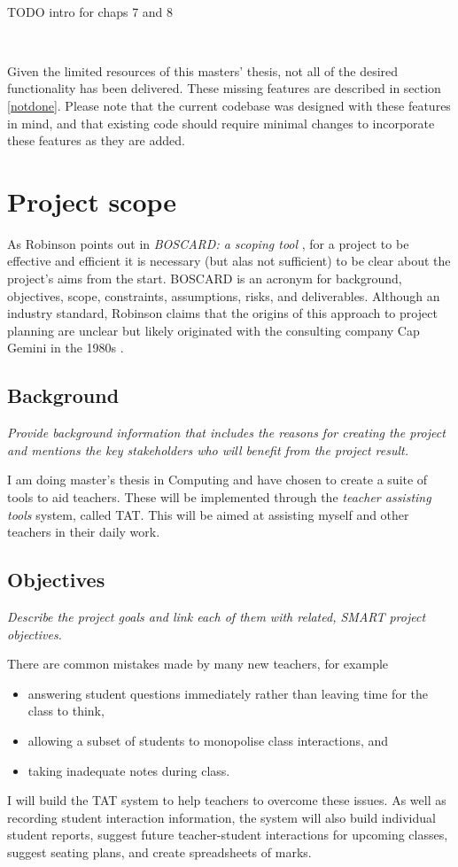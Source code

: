 \documentclass[10pt]{article}
\begin{document}
\

TODO intro for chaps 7 and 8

\

Given the limited resources of this masters' thesis, not all of the desired functionality has been delivered. These missing features are described in section \ref{notdone}. Please note that the current codebase was designed with these features in mind, and that existing code should require minimal changes to incorporate these features as they are added.

\section{Project scope}

As Robinson points out in \emph{BOSCARD: a scoping tool} \cite{Rob19}, for a project to be effective and efficient it is necessary (but alas not sufficient) to be clear about the project's aims from the start. BOSCARD is an acronym for background, objectives, scope, constraints, assumptions, risks, and deliverables. Although an industry standard, Robinson claims that the origins of this approach to project planning are unclear but likely originated with the consulting company Cap Gemini in the 1980s \cite[p. 181]{Rob19}.

\subsection{Background}
\emph{Provide background information that includes the reasons for creating the project and mentions the key stakeholders who will benefit from the project result.}

I am doing master's thesis in Computing and have chosen to create a suite of tools to aid teachers. These will be implemented through the \emph{teacher assisting tools} system, called TAT. This will be aimed at assisting  myself and other teachers in their daily work.

\subsection{Objectives} 
\emph{Describe the project goals and link each of them with related, SMART project objectives.}

There are common mistakes made by many new teachers, for example 
\begin{itemize}
\item answering student questions immediately rather than leaving time for the class to think,
\item allowing a subset of students to monopolise class interactions, and
\item taking inadequate notes during class.
\end{itemize}
I will build the TAT system to help teachers to overcome these issues. As well as recording student interaction information, the system will also build individual student reports, suggest future teacher-student interactions for upcoming classes, suggest seating plans, and create spreadsheets of marks.
\end{document}

